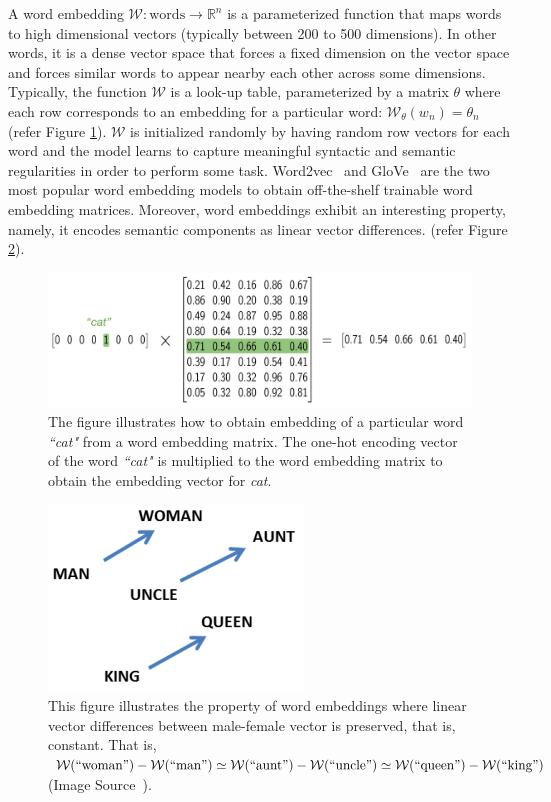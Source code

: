 A word embedding $\mathcal{W} : \text{words} \rightarrow \mathbb{R}^n$ is a parameterized function that maps words to high dimensional vectors (typically between 200 to 500 dimensions). In other words, it is a dense vector space that forces a fixed dimension on the vector space and forces similar words to appear nearby each other across some dimensions. Typically, the function $\mathcal{W}$ is a look-up table, parameterized by a matrix $\theta$ where each row corresponds to an embedding for a particular word: $\mathcal{W}_{\theta} (w_n) = \theta_n$ (refer Figure \ref{fig:word-embedding-matrix}). $\mathcal{W}$ is initialized randomly by having random row vectors for each word and the model learns to capture meaningful syntactic and semantic regularities in order to perform some task. Word2vec~\cite{mikolov2013distributed} and GloVe~\cite{pennington2014glove} are the two most popular word embedding models to obtain off-the-shelf trainable word embedding matrices. Moreover, word embeddings exhibit an interesting property, namely, it encodes semantic components as linear vector differences. (refer Figure \ref{fig:linear-vector}). 
 

\begin{figure}[!htb]
    \centering
    \includegraphics[scale=0.5]{Figures/word-embedding-matrix.png}
    \caption{The figure illustrates how to obtain embedding of a particular word \emph{``cat"} from a word embedding matrix. The one-hot encoding vector of the word \emph{``cat"} is multiplied to the word embedding matrix to obtain the embedding vector for \emph{cat}.}
    \label{fig:word-embedding-matrix}
\end{figure}


\begin{figure}[!htb]
    \centering
    \includegraphics[scale=0.5]{Figures/Mikolov-GenderVecs.png}
    \caption{This figure illustrates the property of word embeddings where linear vector differences between male-female vector is preserved, that is, constant. That is, $\mathcal{W}(``\text{woman}") - \mathcal{W}(``\text{man}") \simeq \mathcal{W}(``\text{aunt}") - \mathcal{W}(``\text{uncle}") \simeq \mathcal{W}(``\text{queen}") - \mathcal{W}(``\text{king}")$ (Image Source~\cite{mikolov2013distributed}).}
    \label{fig:linear-vector}
\end{figure}


